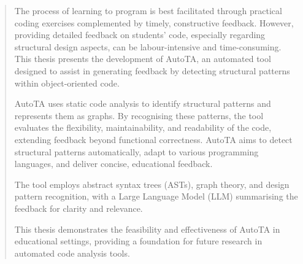 \begin{abstract}
The process of learning to program is best facilitated through practical coding exercises complemented by timely, constructive feedback. However, providing detailed feedback on students’ code, especially regarding structural design aspects, can be labour-intensive and time-consuming. This thesis presents the development of AutoTA, an automated tool designed to assist in generating feedback by detecting structural patterns within object-oriented code.

AutoTA uses static code analysis to identify structural patterns and represents them as graphs. By recognising these patterns, the tool evaluates the flexibility, maintainability, and readability of the code, extending feedback beyond functional correctness. AutoTA aims to detect structural patterns automatically, adapt to various programming languages, and deliver concise, educational feedback.

The tool employs abstract syntax trees (ASTs), graph theory, and design pattern recognition, with a Large Language Model (LLM) summarising the feedback for clarity and relevance. 

This thesis demonstrates the feasibility and effectiveness of AutoTA in educational settings, providing a foundation for future research in automated code analysis tools.
\end{abstract}